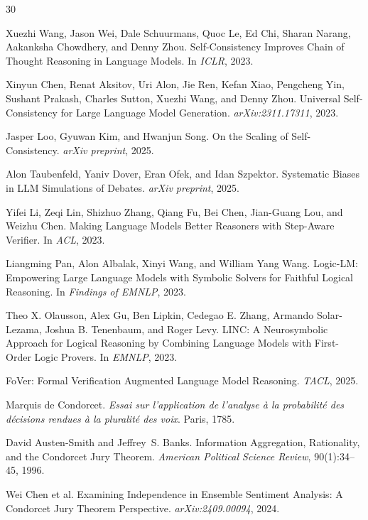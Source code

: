 \documentclass[11pt,a4paper]{article}
\begin{document}
\begin{thebibliography}{30}

Xuezhi Wang, Jason Wei, Dale Schuurmans, Quoc Le, Ed Chi, Sharan Narang, Aakanksha Chowdhery, and Denny Zhou.
Self-Consistency Improves Chain of Thought Reasoning in Language Models.
In {\em ICLR}, 2023.

Xinyun Chen, Renat Aksitov, Uri Alon, Jie Ren, Kefan Xiao, Pengcheng Yin, Sushant Prakash, Charles Sutton, Xuezhi Wang, and Denny Zhou.
Universal Self-Consistency for Large Language Model Generation.
{\em arXiv:2311.17311}, 2023.

Jasper Loo, Gyuwan Kim, and Hwanjun Song.
On the Scaling of Self-Consistency.
{\em arXiv preprint}, 2025.

Alon Taubenfeld, Yaniv Dover, Eran Ofek, and Idan Szpektor.
Systematic Biases in LLM Simulations of Debates.
{\em arXiv preprint}, 2025.

Yifei Li, Zeqi Lin, Shizhuo Zhang, Qiang Fu, Bei Chen, Jian-Guang Lou, and Weizhu Chen.
Making Language Models Better Reasoners with Step-Aware Verifier.
In {\em ACL}, 2023.

Liangming Pan, Alon Albalak, Xinyi Wang, and William Yang Wang.
Logic-LM: Empowering Large Language Models with Symbolic Solvers for Faithful Logical Reasoning.
In {\em Findings of EMNLP}, 2023.

Theo X. Olausson, Alex Gu, Ben Lipkin, Cedegao E. Zhang, Armando Solar-Lezama, Joshua B. Tenenbaum, and Roger Levy.
LINC: A Neurosymbolic Approach for Logical Reasoning by Combining Language Models with First-Order Logic Provers.
In {\em EMNLP}, 2023.

FoVer: Formal Verification Augmented Language Model Reasoning.
{\em TACL}, 2025.

Marquis de Condorcet.
{\em Essai sur l'application de l'analyse \`a la probabilit\'e des d\'ecisions rendues \`a la pluralit\'e des voix}.
Paris, 1785.

David Austen-Smith and Jeffrey~S. Banks.
Information Aggregation, Rationality, and the Condorcet Jury Theorem.
{\em American Political Science Review}, 90(1):34--45, 1996.

Wei Chen et al.
Examining Independence in Ensemble Sentiment Analysis: A Condorcet Jury Theorem Perspective.
{\em arXiv:2409.00094}, 2024.


\end{thebibliography}
\end{document}

